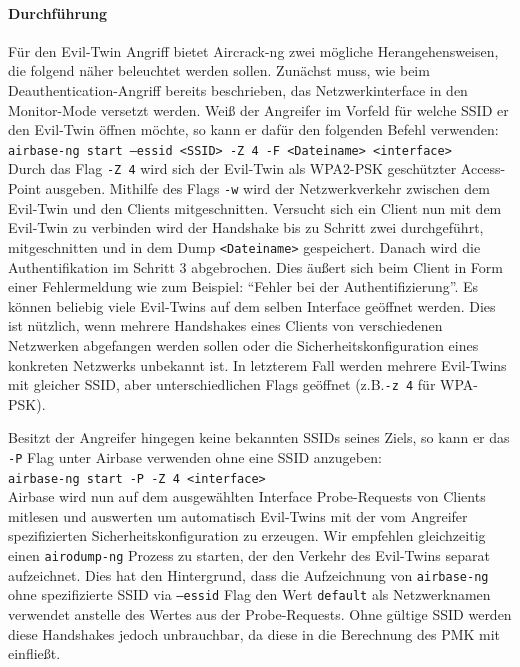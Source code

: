 \paragraph{Durchführung}
Für den Evil-Twin Angriff bietet Aircrack-ng zwei mögliche Herangehensweisen, die folgend näher beleuchtet werden sollen.
Zunächst muss, wie beim Deauthentication-Angriff bereits beschrieben, das Netzwerkinterface in den Monitor-Mode versetzt werden.
Weiß der Angreifer im Vorfeld für welche SSID er den Evil-Twin öffnen möchte, so kann er dafür den folgenden Befehl verwenden:
\\\texttt{airbase-ng start --essid <SSID> -Z 4 -F <Dateiname> <interface>}\\
Durch das Flag \texttt{-Z 4} wird sich der Evil-Twin als WPA2-PSK geschützter Access-Point ausgeben.
Mithilfe des Flags \texttt{-w} wird der Netzwerkverkehr zwischen dem Evil-Twin und den Clients mitgeschnitten.
Versucht sich ein Client nun mit dem Evil-Twin zu verbinden wird der Handshake bis zu Schritt zwei durchgeführt, mitgeschnitten und in dem Dump \texttt{<Dateiname>} gespeichert.
Danach wird die Authentifikation im Schritt 3 abgebrochen.
Dies äußert sich beim Client in Form einer Fehlermeldung wie zum Beispiel: \enquote{Fehler bei der Authentifizierung}.
Es können beliebig viele Evil-Twins auf dem selben Interface geöffnet werden. 
Dies ist nützlich, wenn mehrere Handshakes eines Clients von verschiedenen Netzwerken abgefangen werden sollen oder die Sicherheitskonfiguration eines konkreten Netzwerks unbekannt ist.
In letzterem Fall werden mehrere Evil-Twins mit gleicher SSID, aber unterschiedlichen Flags geöffnet (z.B.\texttt{-z 4} für WPA-PSK). %


Besitzt der Angreifer hingegen keine bekannten SSIDs seines Ziels, so kann er das \texttt{-P} Flag unter Airbase verwenden ohne eine SSID anzugeben:
\\\texttt{airbase-ng start -P -Z 4 <interface>}\\
Airbase wird nun auf dem ausgewählten Interface Probe-Requests von Clients mitlesen und auswerten um automatisch Evil-Twins mit der vom Angreifer spezifizierten Sicherheitskonfiguration zu erzeugen.
Wir empfehlen gleichzeitig einen \texttt{airodump-ng} Prozess zu starten, der den Verkehr des Evil-Twins separat aufzeichnet.
Dies hat den Hintergrund, dass die Aufzeichnung von \texttt{airbase-ng} ohne spezifizierte SSID via \texttt{--essid} Flag den Wert \texttt{default} als Netzwerknamen verwendet anstelle des Wertes aus der Probe-Requests.
Ohne gültige SSID werden diese Handshakes jedoch unbrauchbar, da diese in die Berechnung des PMK mit einfließt.


